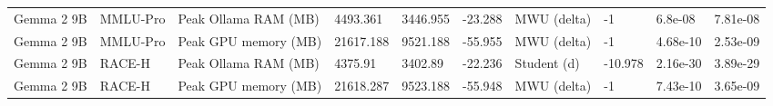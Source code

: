 \begin{table}[t]
{\begin{tabular}{llllllllll}
Gemma 2 9B & MMLU-Pro & Peak Ollama RAM (MB) & 4493.361 & 3446.955 & -23.288 & MWU (delta) & -1 & 6.8e-08 & 7.81e-08 \\
Gemma 2 9B & MMLU-Pro & Peak GPU memory (MB) & 21617.188 & 9521.188 & -55.955 & MWU (delta) & -1 & 4.68e-10 & 2.53e-09 \\
Gemma 2 9B & RACE-H & Peak Ollama RAM (MB) & 4375.91 & 3402.89 & -22.236 & Student (d) & -10.978 & 2.16e-30 & 3.89e-29 \\
Gemma 2 9B & RACE-H & Peak GPU memory (MB) & 21618.287 & 9523.188 & -55.948 & MWU (delta) & -1 & 7.43e-10 & 3.65e-09 \\
\bottomrule
\end{tabular}
}
\end{table}
